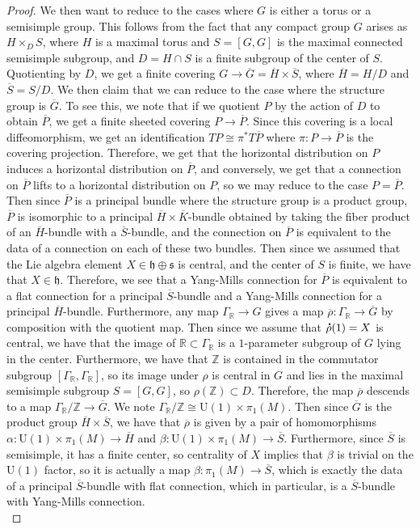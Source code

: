 \documentclass[psamsfonts, 12pt]{amsart}
\theoremstyle{definition}
\theoremstyle{remark}
\newcommand{\R}{\mathbb{R}}
\newcommand{\Z}{\mathbb{Z}}
\newcommand*{\dt}[1]{%
   \accentset{\mbox{\large\bfseries .}}{#1}}
\begin{document}
\begin{proof}
We then want to reduce to the cases where $G$ is either a torus or a semisimple group.
This follows from the fact that any compact group $G$ arises as $H \times_D S$, where
$H$ is a maximal torus and $S = [G,G]$ is the maximal connected semisimple subgroup,
and $D = H \cap S$ is a finite subgroup of the center of $S$. Quotienting by $D$, we
get a finite covering $G \to \overline{G} = \overline{H} \times \overline{S}$, where
$\overline{H} = H/D$ and $\overline{S} = S/D$. We then claim that we can reduce to
the case where the structure group is $\overline{G}$. To see this, we note that
if we quotient $P$ by the action of $D$ to obtain $\overline{P}$, we get a finite
sheeted covering $P \to \overline{P}$. Since this covering is a local diffeomorphism,
we get an identification $TP \cong \pi^*T\overline{P}$ where $\pi : P \to \overline{P}$
is the covering projection. Therefore, we get that the horizontal distribution on
$P$ induces a horizontal distribution on $\overline{P}$, and conversely, we get
that a connection on $\overline{P}$ lifts to a horizontal distribution on $P$, so we
may reduce to the case $P = \overline{P}$. Then since $\overline{P}$ is a principal
bundle where the structure group is a product group, $\overline{P}$ is isomorphic
to a principal $\overline{H} \times \overline{K}$-bundle obtained by taking the
fiber product of an $\overline{H}$-bundle with a $\overline{S}$-bundle, and
the connection on $\overline{P}$ is equivalent to the data of a connection
on each of these two bundles. Then since we assumed that the Lie algebra
element $X \in \mathfrak{h} \oplus \mathfrak{s}$ is central, and the center of
$S$ is finite, we have that $X \in \mathfrak{h}$. Therefore, we see that a Yang-Mills
connection for $\overline{P}$ is equivalent to a flat connection for a principal
$\overline{S}$-bundle and a Yang-Mills connection for a principal
$\overline{H}$-bundle. Furthermore, any map  $\Gamma_\R \to G$ gives a map
$\overline{\rho} : \Gamma_\R \to \overline{G}$ by composition with the quotient map.
Then since we assume that $\dt{\rho}(1) = X$ is central, we have that the image of
$\R \subset \Gamma_\R$ is a $1$-parameter subgroup of $G$ lying in the center.
Furthermore, we have that $\Z$ is contained in the commutator subgroup
$[\Gamma_\R,\Gamma_\R]$, so its image under $\rho$ is central in
$G$ and lies in the maximal semisimple subgroup $S = [G,G]$, so $\rho(\Z) \subset D$.
Therefore, the map $\overline{\rho}$ descends to a map
$\Gamma_\R / \Z \to \overline{G}$. We note
$\Gamma_\R / \Z \cong \mathrm{U}(1) \times \pi_1(M)$. Then since $\overline{G}$ is the
product group $\overline{H} \times \overline{S}$, we have that $\overline{\rho}$ is
given by a pair of homomorphisms $
\alpha : \mathrm{U}(1) \times \pi_1(M) \to \overline{H}$ and
$\beta : \mathrm{U}(1) \times \pi_1(M) \to \overline{S}$. Furthermore, since
$\overline{S}$ is semisimple, it has a finite center, so centrality of $X$ implies that
$\beta$ is trivial on the $\mathrm{U}(1)$ factor, so it is actually a map
$\beta : \pi_1(M) \to \overline{S}$, which is exactly the data of a principal
$\overline{S}$-bundle with flat connection, which in particular, is a
$\overline{S}$-bundle with Yang-Mills connection. \\


\end{proof}
\end{document}

